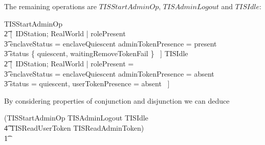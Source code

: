 The remaining operations are $TISStartAdminOp$, $TISAdminLogout$ and
$TISIdle$:
\begin{argue}
        \pre TISStartAdminOp \equiv 
\\      \t2 [~IDStation; RealWorld | rolePresent \neq \Nil
\\      \t3      \land enclaveStatus = enclaveQuiescent \land adminTokenPresence = present 
\\ \t3          \land status \in \{ quiescent, waitingRemoveTokenFail \} ~]
\also
        \pre TISIdle \equiv 
\\      \t2 [~IDStation; RealWorld |  rolePresent = \Nil
\\      \t3     \land enclaveStatus = enclaveQuiescent \land
adminTokenPresence = absent 
\\ \t3          \land status = quiescent, \land userTokenPresence =
absent ~]
\end{argue}

By considering properties of conjunction and disjunction we can deduce
\begin{argue}
\pre (TISStartAdminOp \lor TISAdminLogout \lor TISIdle 
 \\ \t4         \lor TISReadUserToken \lor TISReadAdminToken) 
\\ \t1 \equiv
 [~ IDStation; RealWorld | 
\\      \t3 (status = quiescent \land enclaveStatus = enclaveQuiescent ) 
\\      \t3 \lor (status = waitingRemoveTokenFail \land enclaveStatus =
enclaveQuiescent 
\\ \t4 \land adminTokenPresence = present ) 
\\      \t3 \lor (status = quiescent \land enclaveStatus =
waitingRemoveAdminTokenFail 
\\ \t4 \land userTokenPresence = present ) 
\\      \t3 \lor (enclaveStatus = enclaveQuiescent \land rolePresent
\neq \Nil 
\\ \t4  \land adminTokenPresence = absent)
\\      \t3 \lor (enclaveStatus = enclaveQueiscent \land rolePresent
\neq \Nil 
\\ \t4  \land adminTokenPresence = present \land \lnot AdminTokenOK ~]    
\end{argue}

